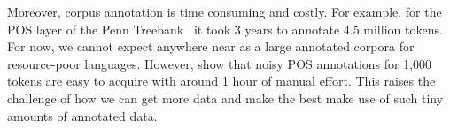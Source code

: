 \documentclass[12pt,twoside,final,hidelinks]{ltthesis}
\theoremstyle{definition}
\begin{document}
Moreover, corpus annotation is time consuming and costly. For example, for the POS layer of the Penn Treebank~\cite{PenTreeBank} it took 3 years to annotate 4.5 million tokens. For now, we cannot expect anywhere near as a large annotated corpora for resource-poor languages. However,  show that noisy POS annotations for 1,000 tokens are easy to acquire with around 1 hour of manual effort. This raises the challenge of how we can get more data and make the best make use of such tiny amounts of annotated data. %
\end{document}
